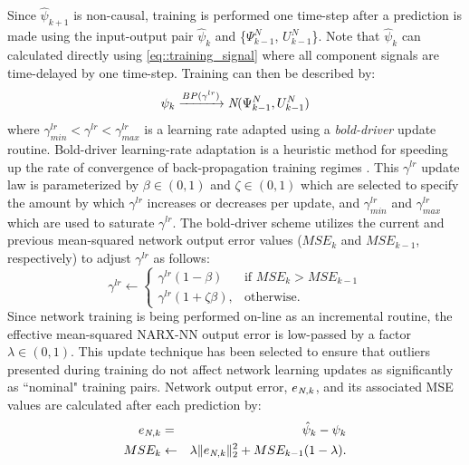 			Since $\hat{\psi}_{k+1}$ is non-causal, training is performed one time-step after a prediction is made using the input-output pair $\hat{\psi}_{k}$ and \{${\Psi}_{k-1}^{N}$, ${U}_{k-1}^{N}$\}. Note that $\hat{\psi}_{k}$ can calculated directly using \ref{eq::training_signal} where all component signals are time-delayed by one time-step. Training can then be described by:
				\begin{equation}
					\psi_{k} \xrightarrow{BP(\gamma^{lr})} \emph{N}({\Psi}_{k-1}^{N},{U}_{k-1}^{N})
					\label{eq::training}
				\end{equation}
			where $\gamma^{lr} _{min} < \gamma^{lr} < \gamma^{lr} _{max}$ is a learning rate adapted using a \emph{bold-driver} update routine. Bold-driver learning-rate adaptation is a  heuristic method for speeding up the rate of convergence of back-propagation training regimes \cite{Battiti1992,Magoulas1999}. This $\gamma^{lr}$ update law is parameterized by $\beta \in (0,1)$ and $\zeta \in (0,1)$ which are selected to specify the amount by which $\gamma^{lr}$ increases or decreases per update, and $\gamma^{lr} _{min}$ and $\gamma^{lr} _{max}$ which are used to saturate $\gamma^{lr}$.  The bold-driver scheme utilizes the current and previous mean-squared network output error values ($MSE_{k}$ and $MSE_{k-1}$, respectively) to adjust $\gamma^{lr}$ as follows:
				\begin{equation}
				    \gamma^{lr} \leftarrow 
					\begin{cases}
				    \gamma^{lr} (1- \beta) 		& \text{if } MSE_{k} > MSE_{k-1}\\
				    \gamma^{lr} (1+\zeta \beta),& \text{otherwise}.
					\end{cases}
				\end{equation}
			Since network training is being performed on-line as an incremental routine, the effective mean-squared NARX-NN  output error is low-passed by a factor $\lambda \in (0,1)$. This update technique has been selected to ensure that outliers presented during training do not affect network learning updates as significantly as ``nominal" training pairs. Network output error, $e_{\emph{N},k}$, and its associated MSE values are calculated after each prediction by:
				\begin{eqnarray}
					e_{\emph{N},k} 	&=& \hat{\psi}_{k} - \psi_{k} \nonumber\\
					MSE_{k} 		&\leftarrow& \lambda \|e_{\emph{N},k}\|_{2}^{2} + MSE_{k-1}(1-\lambda).
				\end{eqnarray}


